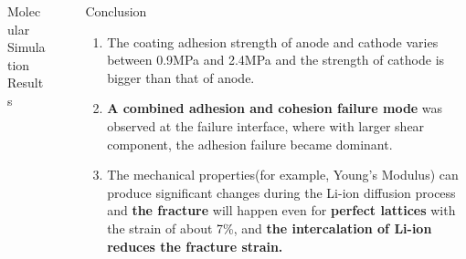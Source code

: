 \documentclass[final]{beamer}
\newlength{\sepwid}
\newlength{\onecolwid}
\newlength{\twocolwid}
\begin{document}
\begin{frame}[t]
\begin{columns}[t]
\begin{column}{\twocolwid}
\begin{columns}[t,totalwidth=\twocolwid]
\begin{column}{\onecolwid}
\begin{block}{Molecular Simulation Results}
\end{block}


\end{column} %

\end{columns} %

\end{column} %

\begin{column}{\sepwid}\end{column} %

\begin{column}{\onecolwid} %


\begin{block}{Conclusion}
\begin{enumerate}
	\item The coating adhesion strength of anode and cathode varies between 0.9MPa and 2.4MPa and the strength of cathode is bigger than that of anode.
	\item \textbf{A combined adhesion and cohesion failure mode} was observed at the failure interface, where with larger shear component, the adhesion failure became dominant. 
	\item The mechanical properties(for example, Young's Modulus) can produce significant changes during the Li-ion diffusion process and \textbf{the fracture} will happen even for \textbf{perfect lattices} with the strain of about 7\%, and \textbf{the intercalation of Li-ion reduces the fracture strain.} 
\end{enumerate}
\end{block}






\end{column}
\end{columns}
\end{frame}
\end{document}
